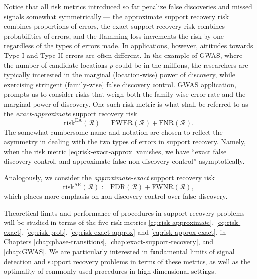 Notice that all risk metrics introduced so far penalize false discoveries and missed signals somewhat symmetrically --- the approximate support recovery risk combines proportions of errors, the exact support recovery risk combines probabilities of errors, and the Hamming loss increments the risk by one regardless of the types of errors made.
In applications, however, attitudes towards Type I and Type II errors are often different.
In the example of GWAS, where the number of candidate locations $p$ could be in the millions, the researchers are typically interested in the marginal (location-wise) power of discovery, while exercising stringent (family-wise) false discovery control. 
  GWAS application, prompts us to consider risks that weigh both the family-wise error rate and the marginal power of discovery.
One such risk metric is what shall be referred to as the \emph{exact-approximate} support recovery risk
\begin{equation} \label{eq:risk-exact-approx}
    \mathrm{risk}^{\mathrm{EA}}(\mathcal{R}) := \mathrm{FWER}(\mathcal{R}) + \mathrm{FNR}(\mathcal{R}).
\end{equation}
The somewhat cumbersome name and notation are chosen to reflect
the asymmetry in dealing with the two types of errors in support recovery.
Namely, when the risk metric \eqref{eq:risk-exact-approx} vanishes, we have ``exact false discovery control, and approximate false non-discovery control'' asymptotically.

Analogously, we consider the \emph{approximate-exact} support recovery risk
\begin{equation} \label{eq:risk-approx-exact}
    \mathrm{risk}^{\mathrm{AE}}(\mathcal{R}) := \mathrm{FDR}(\mathcal{R}) + \mathrm{FWNR}(\mathcal{R}),
\end{equation}
which places more emphasis on non-discovery control over false discovery.

Theoretical limits and performance of procedures in support recovery problems will be studied in terms of the five risk metrics \eqref{eq:risk-approximate}, \eqref{eq:risk-exact}, \eqref{eq:risk-prob}, \eqref{eq:risk-exact-approx} and \eqref{eq:risk-approx-exact}, in Chapters \ref{chap:phase-transitions}, \ref{chap:exact-support-recovery}, and \ref{chap:GWAS}.
We are particularly interested in fundamental limits of signal detection and support recovery problems in terms of these metrics, as well as the optimality of commonly used procedures in high dimensional settings. 

